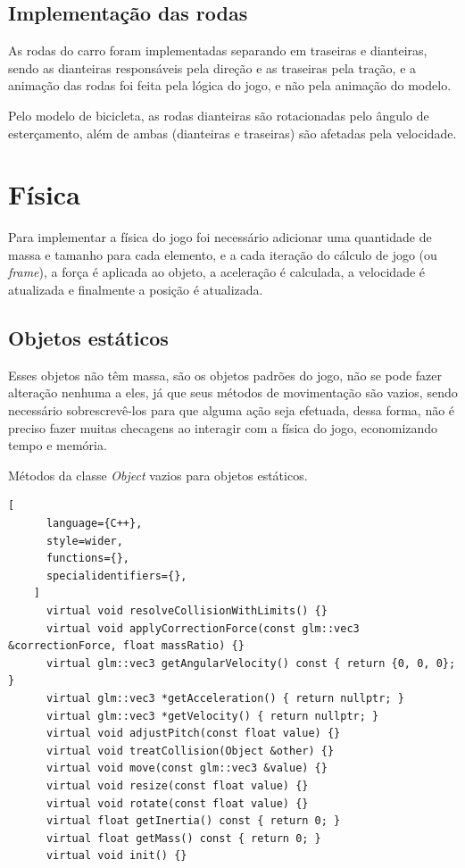 \subsection{Implementação das rodas}

As rodas do carro foram implementadas separando em traseiras e dianteiras, sendo as dianteiras responsáveis pela direção e as traseiras pela tração, e a animação das rodas foi feita pela lógica do jogo, e não pela animação do modelo.

Pelo modelo de bicicleta, as rodas dianteiras são rotacionadas pelo ângulo de esterçamento, além de ambas (dianteiras e traseiras) são afetadas pela velocidade.

\section{Física}

Para implementar a física do jogo foi necessário adicionar uma quantidade de massa e tamanho para cada elemento, e a cada iteração do cálculo de jogo (ou \textit{frame}), a força é aplicada ao objeto, a aceleração é calculada, a velocidade é atualizada e finalmente a posição é atualizada.

\subsection{Objetos estáticos}

Esses objetos não têm massa, são os objetos padrões do jogo, não se pode fazer alteração nenhuma a eles, já que seus métodos de movimentação são vazios, sendo necessário sobrescrevê-los para que alguma ação seja efetuada, dessa forma, não é preciso fazer muitas checagens ao interagir com a física do jogo, economizando tempo e memória.

\begin{programruledcaption}{Métodos da classe \textit{Object} vazios para objetos estáticos.\label{prog:object-methods}}
    \begin{lstlisting}[
      language={C++},
      style=wider,
      functions={},
      specialidentifiers={},
    ]
      virtual void resolveCollisionWithLimits() {}
      virtual void applyCorrectionForce(const glm::vec3 &correctionForce, float massRatio) {}
      virtual glm::vec3 getAngularVelocity() const { return {0, 0, 0}; }
      virtual glm::vec3 *getAcceleration() { return nullptr; }
      virtual glm::vec3 *getVelocity() { return nullptr; }
      virtual void adjustPitch(const float value) {}
      virtual void treatCollision(Object &other) {}
      virtual void move(const glm::vec3 &value) {}
      virtual void resize(const float value) {}
      virtual void rotate(const float value) {}
      virtual float getInertia() const { return 0; }
      virtual float getMass() const { return 0; }
      virtual void init() {}
    \end{lstlisting}
\end{programruledcaption}

